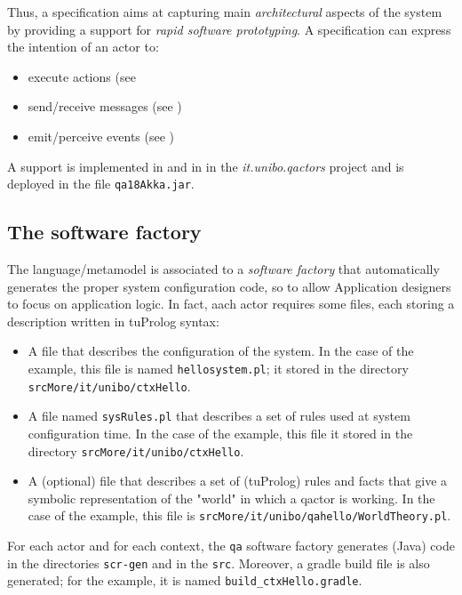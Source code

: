 Thus, a \qa{} specification aims at capturing main \textit{architectural} aspects of the system by providing a support for \textit{rapid software prototyping}. A \qa{} specification can express the intention of an actor to:
\begin{itemize}
\item execute actions (see 
\item send/receive messages (see )
\item emit/perceive events   (see )
\end{itemize}


A \qa{} support is implemented in \java{} and in \tuprolog{} in the \textit{it.unibo.qactors} project and is deployed in the file \texttt{qa18Akka.jar}.


\subsection{The software factory}

The \qa{} language/metamodel is associated to a \textit{software factory} that automatically generates the proper system configuration code, so to allow Application designers to focus on application logic.
In fact, aach actor requires some files, each storing a description written in tuProlog syntax:
\begin{itemize}
\item A file that describes the configuration of the system. In the case of the example, this file is named \texttt{hellosystem.pl}; it stored in the directory \texttt{srcMore/it/unibo/ctxHello}.
\item A file named \texttt{sysRules.pl} that describes a set of rules used at system configuration time. In the case of the example, this file it stored in the directory \texttt{srcMore/it/unibo/ctxHello}.
\item A (optional) file that describes a set of (tuProlog) rules and facts that give a symbolic representation of the "world" in which a qactor is working. In the case of the example, this file is \texttt{srcMore/it/unibo/qahello/WorldTheory.pl}.
\end{itemize}


For each actor and for each context, the \texttt{qa} software factory generates (Java) code in the directories \texttt{scr-gen} and in the \texttt{src}. Moreover, a gradle build file is also generated; for the example, it is named \texttt{build\_ctxHello.gradle}. 

